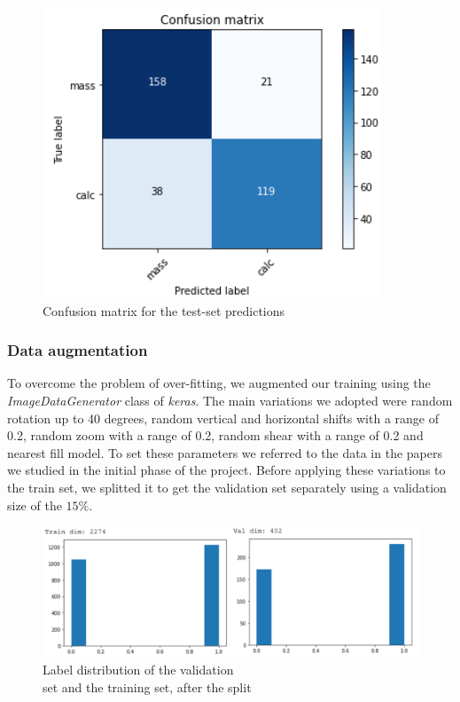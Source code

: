 \documentclass[11pt,a4paper,oneside]{article}
\begin{document}
\begin{figure}[h]
\begin{minipage}[c]{.35\textwidth}
		\includegraphics[width=.9\textwidth]{images/scratch_matrix}
		\caption{Confusion matrix for the test-set predictions}
		\label{fig:scratch_matrix}
	\end{minipage}%
\end{figure}

\clearpage
\subsubsection{Data augmentation}
To overcome the problem of over-fitting, we augmented our training using the \textit{ImageDataGenerator} class of \textit{keras}. The main variations we adopted were random rotation up to 40 degrees, random vertical and horizontal shifts with a range of 0.2, random zoom with a range of 0.2, random shear with a range of 0.2 and nearest fill model. To set these parameters we referred to the data in the papers we studied in the initial phase of the project. Before applying these variations to the train set, we splitted it to get the validation set separately using a validation size of the $15\%$.

\begin{figure}[h]
\centering
\includegraphics[width=.7\textwidth]{images/val_label_distribution}
\caption{Label distribution of the validation \\set and the training set, after the split}
\label{fig:val_label}
\end{figure}
\end{document}
